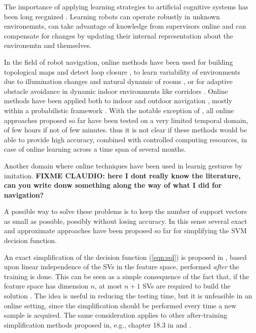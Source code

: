 The importance of applying learning strategies to artificial cognitive systems has been long recgnized
\cite{Thrun:Mitchell:LifelongRobotLearning}. Learning robots can operate robustly in unknown environemnts,
can take advantage of knowledge from supervisors online and can compensate for changes by updating their internal representation about the environemtn and themselves.

In the field of robot navigation, online methods have been used for building topological maps and detect loop closure \cite{tapus},
to learn variability of environments due to illumination changes and natural dynamic of rooms \cite{Luo:IROS07}, or for adaptive obstacle avoidance in dynamic indoor environments
like corridors \cite{Zeng:Weng:ICRA04}.  Online methods have been applied both to indoor \cite{} and outdoor navigation \cite{}, mostly within a probabilistic
framework \cite{}. With the notable exception of \cite{roger:IROS07}, all online approaches proposed so far have been tested on a very limited
temporal domain, of few hours if not of few minutes. thus it is not clear if these methods would be able to provide high accuracy, combined with controlled computing resources, in case of online learning across a time span of several months.

Another domain where online techniques have been used in learnig gestures by imitation.
{\bf FIXME CLAUDIO: here I dont really know the literature, can you write donw something along the way
of what I did for navigation?}



A possible way to solve these problems is to keep the number of
support vectors as small as possible, possibly without losing accuracy.
In this sense several exact and approximate approaches have been proposed so
far for simplifying the SVM decision function.

An exact simplification of the decision function (\ref{eqn:sol})
is proposed in \cite{DownsGM01}, based upon linear independence of
the SVs in the feature space, performed \emph{after} the training is done.
This can be seen as a simple consequence of the fact that,
if the feature space has
dimension $n$, at most $n+1$ SVs are required to build the
solution \cite{PontilV98}.
The idea is useful in reducing the testing
time, but it is unfeasible in an online setting, since the
simplification should be performed every time a new sample is
acquired. The same consideration applies to other after-training
simplification methods proposed in, e.g., chapter 18.3 in \cite{SmolaS02} and
\cite{NguyenH05}.

